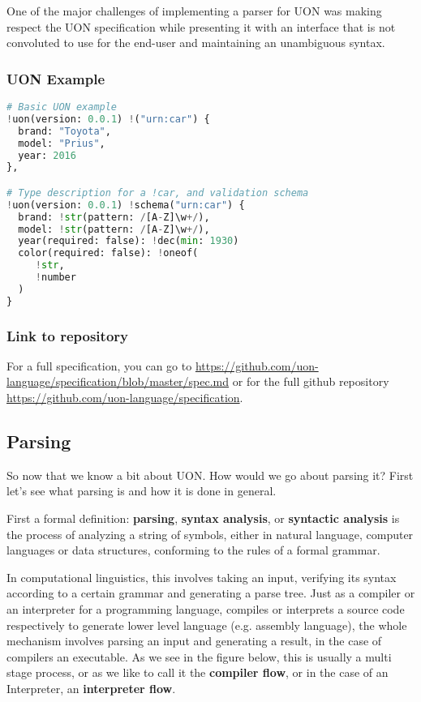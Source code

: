 \documentclass[12pt]{article}
\begin{document}
One of the major challenges of implementing a parser for UON was making respect the UON specification while presenting it with an interface that is not convoluted to use for the end-user and maintaining an unambiguous syntax.

\subsubsection{UON Example}
\begin{lstlisting}[language=python]
# Basic UON example
!uon(version: 0.0.1) !("urn:car") {
  brand: "Toyota",
  model: "Prius",
  year: 2016
},

# Type description for a !car, and validation schema
!uon(version: 0.0.1) !schema("urn:car") {
  brand: !str(pattern: /[A-Z]\w+/),
  model: !str(pattern: /[A-Z]\w+/),
  year(required: false): !dec(min: 1930)
  color(required: false): !oneof(
     !str,
     !number
  )
}
\end{lstlisting}

\subsubsection{Link to repository}
For a full specification, you can go to \url{https://github.com/uon-language/specification/blob/master/spec.md} or for the full github repository \url{https://github.com/uon-language/specification}.

\pagebreak

\subsection{Parsing}
So now that we know a bit about UON. How would we go about parsing it? First let’s see what parsing is and how it is done in general.

First a formal definition: \textbf{parsing}, \textbf{syntax analysis}, or \textbf{syntactic analysis} is the process of analyzing a string of symbols, either in natural language, computer languages or data structures, conforming to the rules of a formal grammar.

In computational linguistics, this involves taking an input, verifying its syntax according to a certain grammar and generating a parse tree. Just as a compiler or an interpreter for a programming language, compiles or interprets a source code respectively to generate lower level language (e.g. assembly language), the whole mechanism involves parsing an input and generating a result, in the case of compilers an executable. As we see in the figure below, this is usually a multi stage process, or as we like to call it the \textbf{compiler flow}, or in the case of an Interpreter, an \textbf{interpreter flow}.
\end{document}
